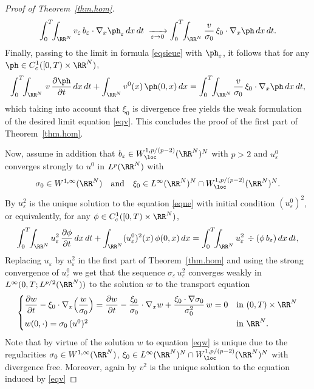 \begin{proof}[Proof of Theorem~\ref{thm.hom}]
\[
\int_0^T\!\!\int_{\RR^N}v_\varepsilon\,b_\varepsilon\cdot\nabla_x\ph_\varepsilon\,dx\,dt\;\xrightarrow[\varepsilon\to 0]\;
\int_0^T\!\!\int_{\RR^N}\dfrac{v}{\sigma_0}\,\xi_0\cdot\nabla_x\ph\,dx\,dt.
\]
Finally, passing to the limit in formula \eqref{eqsieue} with $\ph_\varepsilon$, it follows that for any $\ph\in C^1_c([0,T)\times\RR^N)$,
\[
\int_0^T\!\!\int_{\RR^N}\,v\, \dfrac{\partial\ph}{\partial t}\,dx\,dt+\int_{\RR^N}v^0(x)\,\ph(0,x)\,dx
=\int_0^T\!\!\int_{\RR^N} \dfrac{v}{\sigma_0}\,\xi_0\cdot\nabla_x\ph\,dx\,dt,
\]
which taking into account that $\xi_0$ is divergence free yields the weak formulation of the desired limit equation \eqref{eqv}.
This concludes the proof of the first part of Theorem~\ref{thm.hom}.

Now, assume in addition that $b_\varepsilon\in W^{1,p/(p-2)}_\loc(\RR^N)^N$ with $p>2$ and $u_\varepsilon^0$ converges strongly to $u^0$ in $L^p(\RR^N)$ with
\[
\sigma_0\in W^{1,\infty}(\RR^N)\quad\text{and}\quad \xi_0\in L^\infty(\RR^N)^N\cap W^{1,p/(p-2)}_\loc(\RR^N)^N.
\]
By \cite[Th.\,II.3 and Corollary\,II.1]{DiLi} $u_\varepsilon^2$ is the unique solution to the equation \eqref{eque} with initial condition $(u_\varepsilon^0)^2$, or equivalently, for any $\phi\in C^1_c([0,T)\times\RR^N)$,
\[
\int_0^T\!\!\int_{\RR^N}u_\varepsilon^2\, \dfrac{\partial\phi}{\partial t}\,dx\,dt+\int_{\RR^N}(u_\varepsilon^0)^2(x)\,\phi(0,x)\,dx=\int_0^T\!\!\int_{\RR^N}u_\varepsilon^2\,\div\left(\phi\,b_\varepsilon\right)dx\,dt,
\]
Replacing $u_\varepsilon$ by $u_\varepsilon^2$ in the first part of Theorem~\ref{thm.hom} and using the strong convergence of $u_\varepsilon^0$ we get that the sequence $\sigma_\varepsilon\,u_\varepsilon^2$ converges weakly in $L^\infty(0,T;L^{p/2}(\RR^N))$ to the solution $w$ to the transport equation
\begin{equation}\label{eqw}
\begin{cases}
\dfrac{\partial w}{\partial t}-\xi_0\cdot\nabla_x\Bigl(\dfrac{w}{\sigma_0}\Bigr)= \dfrac{\partial w}{\partial t}-\dfrac{\xi_0}{\sigma_0}\cdot\nabla_x w+ \dfrac{\xi_0\cdot\nabla\sigma_0}{\sigma_0^2}\,w=0
& \mbox{in }(0,T)\times\RR^N
\\[8pt]
w(0,\cdot)=\sigma_0\,(u^0)^2 & \mbox{in }\RR^N.
\end{cases}
\end{equation}
Note that by virtue of \cite[Cor.\,II.1]{DiLi} the solution $w$ to equation \eqref{eqw} is unique due to the regularities $\sigma_0\in W^{1,\infty}(\RR^N)$, $\xi_0\in L^\infty(\RR^N)^N\cap W^{1,p/(p-2)}_\loc(\RR^N)^N$ with divergence free. Moreover, again by \cite[Th.\,II.3 and Corollary\,II.1]{DiLi} $v^2$ is the unique solution to the equation induced by \eqref{eqv}

\end{proof}
